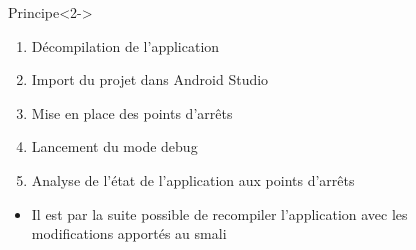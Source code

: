 \documentclass[aspectratio=1610, ]{beamer}%
\begin{document}
\begin{frame}
  \slidetitle[Debugger]
  \begin{columns}
    \begin{column}{0.7\linewidth}
      \begin{block}{Principe}<2->
        \begin{enumerate}
        \item<3-> Décompilation de l'application
        \item<4-> Import du projet dans Android Studio
        \item<5-> Mise en place des points d'arrêts
        \item<6-> Lancement du mode debug
        \item<7-> Analyse de l'état de l'application aux points d'arrêts 
        \end{enumerate}
        \begin{itemize}
        \item<8-> Il est par la suite possible de recompiler l'application avec les modifications apportés au smali
        \end{itemize}
      \end{block}
    \end{column}
    \begin{column}{0.25\linewidth}     
      \centering
     \begin{overlayarea}{0.6\linewidth}{\linewidth}

\end{overlayarea}
\end{column}
\end{columns}
\end{frame}
\end{document}
